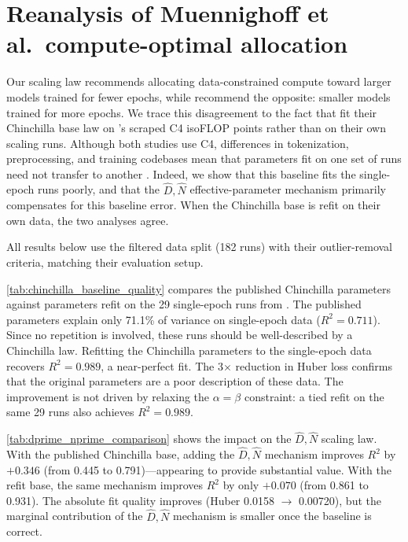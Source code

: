 \newpage
\section{Reanalysis of Muennighoff et al.\ compute-optimal allocation}
\label{app:muennighoff_reanalysis}

Our scaling law recommends allocating data-constrained compute toward larger models trained for fewer epochs, while \citet{muennighoff2023scaling} recommend the opposite: smaller models trained for more epochs. We trace this disagreement to the fact that \citet{muennighoff2023scaling} fit their Chinchilla base law on \citet{hoffmann2022training}'s scraped C4 isoFLOP points rather than on their own scaling runs. Although both studies use C4, differences in tokenization, preprocessing, and training codebases mean that parameters fit on one set of runs need not transfer to another \citep{li2025misfitting}. Indeed, we show that this baseline fits the \citet{muennighoff2023scaling} single-epoch runs poorly, and that the $\widehat{D}, \widehat{N}$ effective-parameter mechanism primarily compensates for this baseline error. When the Chinchilla base is refit on their own data, the two analyses agree.

All results below use the \citet{muennighoff2023scaling} filtered data split (182 runs) with their outlier-removal criteria, matching their evaluation setup.

 \autoref{tab:chinchilla_baseline_quality} compares the published Chinchilla parameters against parameters refit on the 29 single-epoch runs from \citet{muennighoff2023scaling}. The published parameters explain only 71.1\% of variance on single-epoch data ($R^2 = 0.711$). Since no repetition is involved, these runs should be well-described by a Chinchilla law. Refitting the Chinchilla parameters to the \citet{muennighoff2023scaling} single-epoch data recovers $R^2 = 0.989$, a near-perfect fit. The 3$\times$ reduction in Huber loss confirms that the original parameters are a poor description of these data. The improvement is not driven by relaxing the $\alpha=\beta$ constraint: a tied refit on the same 29 runs also achieves $R^2 = 0.989$.



 \autoref{tab:dprime_nprime_comparison} shows the impact on the $\widehat{D}, \widehat{N}$ scaling law. With the published Chinchilla base, adding the $\widehat{D}, \widehat{N}$ mechanism improves $R^2$ by $+0.346$ (from 0.445 to 0.791)---appearing to provide substantial value. With the refit base, the same mechanism improves $R^2$ by only $+0.070$ (from 0.861 to 0.931). The absolute fit quality improves (Huber 0.0158 $\to$ 0.00720), but the marginal contribution of the $\widehat{D}, \widehat{N}$ mechanism is smaller once the baseline is correct.


